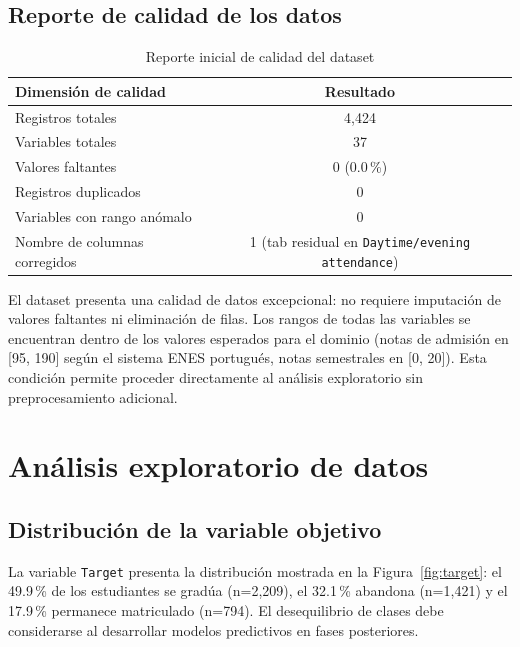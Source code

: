 \documentclass[11pt,a4paper]{article}
\begin{document}
\subsection{Reporte de calidad de los datos}

\begin{table}[h!]
\centering
\begin{tabular}{lc}
\toprule
\textbf{Dimensión de calidad} & \textbf{Resultado} \\
\midrule
Registros totales              & 4,424 \\
Variables totales              & 37 \\
Valores faltantes              & 0 (0.0\,\%) \\
Registros duplicados           & 0 \\
Variables con rango anómalo    & 0 \\
Nombre de columnas corregidos  & 1 (tab residual en \texttt{Daytime/evening attendance}) \\
\bottomrule
\end{tabular}
\caption{Reporte inicial de calidad del dataset}
\end{table}

El dataset presenta una calidad de datos excepcional: no requiere imputación de valores faltantes ni eliminación de filas. Los rangos de todas las variables se encuentran dentro de los valores esperados para el dominio (notas de admisión en [95, 190] según el sistema ENES portugués, notas semestrales en [0, 20]). Esta condición permite proceder directamente al análisis exploratorio sin preprocesamiento adicional.

\newpage
\section{Análisis exploratorio de datos}


\subsection{Distribución de la variable objetivo}

La variable \texttt{Target} presenta la distribución mostrada en la Figura~\ref{fig:target}: el 49.9\,\% de los estudiantes se gradúa (n=2,209), el 32.1\,\% abandona (n=1,421) y el 17.9\,\% permanece matriculado (n=794). El desequilibrio de clases debe considerarse al desarrollar modelos predictivos en fases posteriores.
\end{document}

